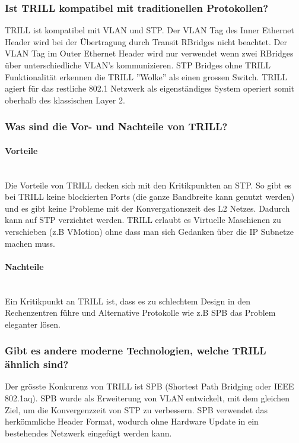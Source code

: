 \subsubsection{Ist TRILL kompatibel mit traditionellen Protokollen?} %
TRILL ist kompatibel mit VLAN und STP. Der VLAN Tag des Inner Ethernet Header wird bei der Übertragung durch Transit RBridges nicht beachtet. Der VLAN Tag im Outer Ethernet Header wird nur verwendet wenn zwei RBridges über unterschiedliche VLAN's kommunizieren. STP Bridges ohne TRILL Funktionalität erkennen die TRILL ''Wolke'' als einen grossen Switch. TRILL agiert für das restliche 802.1 Netzwerk als eigenständiges System operiert somit oberhalb des klassischen Layer 2.  

\subsubsection{Was sind die Vor- und Nachteile von TRILL?}%
\paragraph{Vorteile} \hfill \\
Die Vorteile von TRILL decken sich mit den Kritikpunkten an STP. So gibt es bei TRILL keine blockierten Ports (die ganze Bandbreite kann genutzt werden) und es gibt keine Probleme mit der Konvergationszeit des L2 Netzes. Dadurch kann auf STP verzichtet werden. 
TRILL erlaubt es Virtuelle Maschienen zu verschieben (z.B VMotion) ohne dass man sich Gedanken über die IP Subnetze machen muss.

\paragraph{Nachteile} \hfill \\
Ein Kritikpunkt an TRILL ist, dass es zu schlechtem Design in den Rechenzentren führe und Alternative Protokolle wie z.B SPB das Problem eleganter lösen.

\subsubsection{Gibt es andere moderne Technologien, welche TRILL ähnlich sind?}%
Der grösste Konkurenz von TRILL ist SPB (Shortest Path Bridging oder IEEE 802.1aq). SPB wurde als Erweiterung von VLAN entwickelt, mit dem gleichen Ziel, um die Konvergenzzeit von STP zu verbessern. SPB verwendet das herkömmliche Header Format, wodurch ohne Hardware Update in ein bestehendes Netzwerk eingefügt werden kann. 


